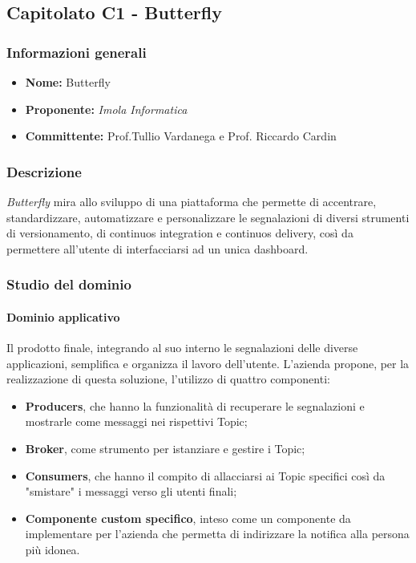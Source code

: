 \subsection{Capitolato C1 - Butterfly}
\subsubsection{Informazioni generali}
\begin{itemize}
\item
\textbf{Nome:} Butterfly 
\item
\textbf{Proponente:} \textit{Imola Informatica} 
\item
\textbf{Committente:} Prof.Tullio Vardanega e Prof. Riccardo Cardin
\end{itemize}
\subsubsection{Descrizione}
\textit{Butterfly} mira allo sviluppo di una piattaforma che permette di
 accentrare, standardizzare, automatizzare e personalizzare le segnalazioni di
 diversi strumenti di versionamento, di continuos integration e continuos
 delivery, così da permettere all'utente di interfacciarsi ad un unica 
 dashboard.
\subsubsection{Studio del dominio}
\paragraph{Dominio applicativo}
Il prodotto finale, integrando al suo interno le segnalazioni delle diverse 
applicazioni, semplifica e organizza il lavoro dell'utente. L'azienda propone,
per la realizzazione di questa soluzione, l'utilizzo di quattro componenti:
\begin{itemize}
	\item \textbf{Producers}, che hanno la funzionalità di recuperare le
	segnalazioni e mostrarle come messaggi nei rispettivi Topic;
	\item \textbf{Broker}, come strumento per istanziare e gestire i Topic;
	\item \textbf{Consumers}, che hanno il compito di allacciarsi ai Topic
    specifici così da "smistare" i messaggi verso gli utenti finali;
    \item \textbf{Componente custom specifico}, inteso come un componente da
    implementare per l'azienda che permetta di indirizzare la notifica alla
    persona più idonea.
\end{itemize}
